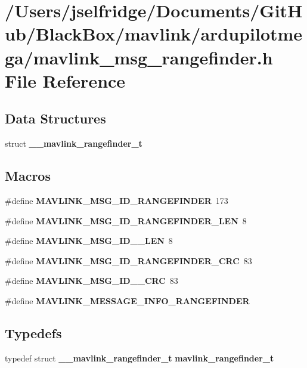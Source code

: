 \section{/\+Users/jselfridge/\+Documents/\+Git\+Hub/\+Black\+Box/mavlink/ardupilotmega/mavlink\+\_\+msg\+\_\+rangefinder.h File Reference}
\label{mavlink__msg__rangefinder_8h}
\subsection*{Data Structures}
\begin{DoxyCompactItemize}
\item 
struct \textbf{ \+\_\+\+\_\+mavlink\+\_\+rangefinder\+\_\+t}
\end{DoxyCompactItemize}
\subsection*{Macros}
\begin{DoxyCompactItemize}
\item 
\#define \textbf{ M\+A\+V\+L\+I\+N\+K\+\_\+\+M\+S\+G\+\_\+\+I\+D\+\_\+\+R\+A\+N\+G\+E\+F\+I\+N\+D\+ER}~173
\item 
\#define \textbf{ M\+A\+V\+L\+I\+N\+K\+\_\+\+M\+S\+G\+\_\+\+I\+D\+\_\+\+R\+A\+N\+G\+E\+F\+I\+N\+D\+E\+R\+\_\+\+L\+EN}~8
\item 
\#define \textbf{ M\+A\+V\+L\+I\+N\+K\+\_\+\+M\+S\+G\+\_\+\+I\+D\+\_\+\_\+\+L\+EN}~8
\item 
\#define \textbf{ M\+A\+V\+L\+I\+N\+K\+\_\+\+M\+S\+G\+\_\+\+I\+D\+\_\+\+R\+A\+N\+G\+E\+F\+I\+N\+D\+E\+R\+\_\+\+C\+RC}~83
\item 
\#define \textbf{ M\+A\+V\+L\+I\+N\+K\+\_\+\+M\+S\+G\+\_\+\+I\+D\+\_\+\_\+\+C\+RC}~83
\item 
\#define \textbf{ M\+A\+V\+L\+I\+N\+K\+\_\+\+M\+E\+S\+S\+A\+G\+E\+\_\+\+I\+N\+F\+O\+\_\+\+R\+A\+N\+G\+E\+F\+I\+N\+D\+ER}
\end{DoxyCompactItemize}
\subsection*{Typedefs}
\begin{DoxyCompactItemize}
\item 
typedef struct \textbf{ \+\_\+\+\_\+mavlink\+\_\+rangefinder\+\_\+t} \textbf{ mavlink\+\_\+rangefinder\+\_\+t}
\end{DoxyCompactItemize}



